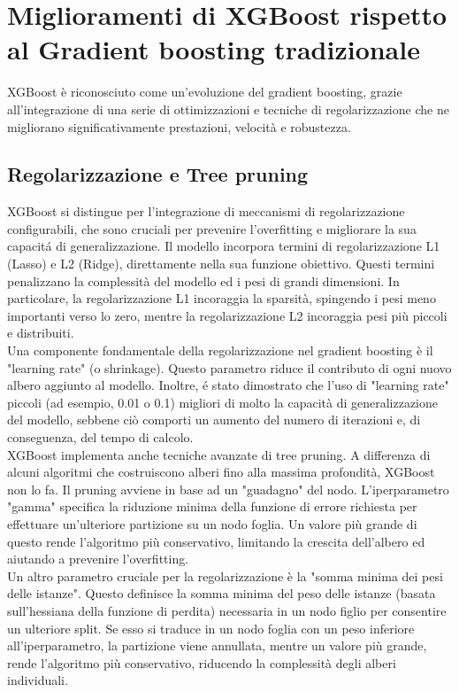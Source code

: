 \documentclass[a4paper,12pt]{report}
\begin{document}
	\section{Miglioramenti di XGBoost rispetto al Gradient boosting tradizionale}
	
	XGBoost è riconosciuto come un'evoluzione del gradient boosting, grazie all'integrazione di una serie di ottimizzazioni e tecniche di regolarizzazione che ne migliorano significativamente prestazioni, velocità e robustezza.
	
	\subsection{Regolarizzazione e Tree pruning}
	
	XGBoost si distingue per l'integrazione di meccanismi di regolarizzazione configurabili, che sono cruciali per prevenire l'overfitting e migliorare la sua capacitá di generalizzazione.
	Il modello incorpora termini di regolarizzazione L1 (Lasso) e L2 (Ridge), direttamente nella sua funzione obiettivo. Questi termini penalizzano la complessità del modello ed i pesi di grandi dimensioni. In particolare, la regolarizzazione L1 incoraggia la sparsità, spingendo i pesi meno importanti verso lo zero, mentre la regolarizzazione L2 incoraggia pesi più piccoli e distribuiti. \\
	Una componente fondamentale della regolarizzazione nel gradient boosting è il "learning rate" (o shrinkage). Questo parametro riduce il contributo di ogni nuovo albero aggiunto al modello. Inoltre, é stato dimostrato che l'uso di "learning rate" piccoli (ad esempio, 0.01 o 0.1) migliori di molto la capacità di generalizzazione del modello, sebbene ciò comporti un aumento del numero di iterazioni e, di conseguenza, del tempo di calcolo. \\
	XGBoost implementa anche tecniche avanzate di tree pruning. A differenza di alcuni algoritmi che costruiscono alberi fino alla massima profondità, XGBoost non lo fa. Il pruning avviene in base ad un "guadagno" del nodo. L'iperparametro "gamma" specifica la riduzione minima della funzione di errore richiesta per effettuare un'ulteriore partizione su un nodo foglia. Un valore più grande di questo rende l'algoritmo più conservativo, limitando la crescita dell'albero ed aiutando a prevenire l'overfitting. \\
	Un altro parametro cruciale per la regolarizzazione è la "somma minima dei pesi delle istanze". Questo definisce la somma minima del peso delle istanze (basata sull'hessiana della funzione di perdita) necessaria in un nodo figlio per consentire un ulteriore split. Se esso si traduce in un nodo foglia con un peso inferiore all'iperparametro, la partizione viene annullata, mentre un valore più grande, rende l'algoritmo più conservativo, riducendo la complessità degli alberi individuali. \\
	
\end{document}
